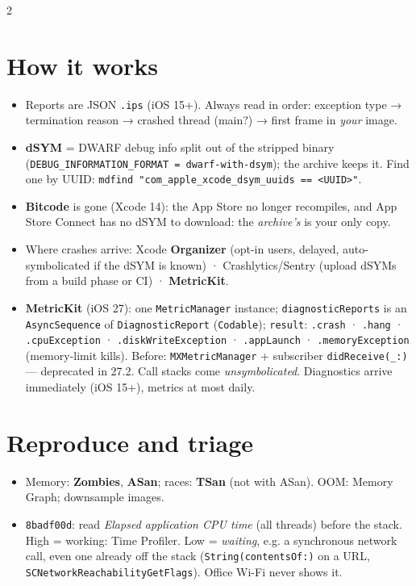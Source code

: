 \documentclass[8pt]{extarticle}
\begin{document}
\begin{multicols}{2}
\section{How it works}
\begin{itemize}
  \item Reports are JSON \texttt{.ips} (iOS 15+). Always read in order: exception type →
        termination reason → crashed thread (main?) → first frame in \emph{your} image.
  \item \textbf{dSYM} = DWARF debug info split out of the stripped binary
        (\texttt{DEBUG\_INFORMATION\_FORMAT = dwarf-with-dsym}); the archive keeps it.
        Find one by UUID: \texttt{mdfind "com\_apple\_xcode\_dsym\_uuids == <UUID>"}.
  \item \textbf{Bitcode} is gone (Xcode 14): the App Store no longer recompiles, and App
        Store Connect has no dSYM to download: the \emph{archive's} is your only copy.
  \item Where crashes arrive: Xcode \textbf{Organizer} (opt-in users, delayed,
        auto-symbolicated if the dSYM is known) · Crashlytics/Sentry (upload dSYMs from a
        build phase or CI) · \textbf{MetricKit}.
  \item \textbf{MetricKit} (iOS 27): one \texttt{MetricManager} instance;
        \texttt{diagnosticReports} is an \texttt{AsyncSequence} of \texttt{DiagnosticReport}
        (\texttt{Codable}); \texttt{result}: \texttt{.crash} · \texttt{.hang} ·
        \texttt{.cpuException} · \texttt{.diskWriteException} · \texttt{.appLaunch} ·
        \texttt{.memoryException} (memory-limit kills). Before: \texttt{MXMetricManager} +
        subscriber \texttt{didReceive(\_:)} — deprecated in 27.2. Call stacks come
        \emph{unsymbolicated}. Diagnostics arrive immediately (iOS 15+), metrics at most daily.
\end{itemize}

\section{Reproduce and triage}
\begin{itemize}
  \item Memory: \textbf{Zombies}, \textbf{ASan}; races: \textbf{TSan} (not with ASan).
        OOM: Memory Graph; downsample images.
  \item \texttt{8badf00d}: read \emph{Elapsed application CPU time} (all threads) before
        the stack. High = working: Time Profiler. Low = \emph{waiting}, e.g. a synchronous
        network call, even one already off the stack (\texttt{String(contentsOf:)} on a URL,
        \texttt{SCNetworkReachabilityGetFlags}). Office Wi-Fi never shows it.
\end{itemize}


\end{multicols}
\end{document}

